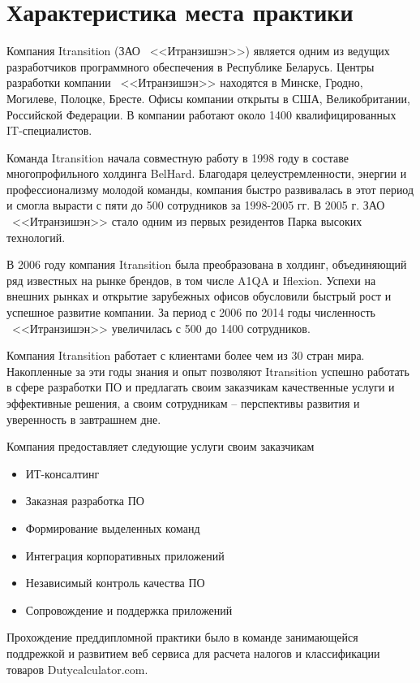\section{Характеристика места практики}
\label{sec:practice:itechart_characteristics}
\newcommand{\company}{\mbox{<<Итранзишэн>>}}

Компания Itransition (ЗАО ~\company{}) является одним из ведущих разработчиков программного обеспечения в Республике Беларусь. Центры разработки компании ~\company{} находятся в Минске, Гродно, Могилеве, Полоцке, Бресте. Офисы компании открыты в США, Великобритании, Российской Федерации. В компании работают около 1400 квалифицированных IT-специалистов.

Команда Itransition начала совместную работу в 1998 году в составе многопрофильного холдинга BelHard. Благодаря целеустремленности, энергии и профессионализму молодой команды, компания быстро развивалась в этот период и смогла вырасти с пяти до 500 сотрудников за 1998-2005 гг. В 2005 г. ЗАО ~\company{} стало одним из первых резидентов Парка высоких технологий.

В 2006 году компания Itransition была преобразована в холдинг, объединяющий ряд известных на рынке брендов, в том числе A1QA и Iflexion. Успехи на внешних рынках и открытие зарубежных офисов обусловили быстрый рост и успешное развитие компании. За период с 2006 по 2014 годы численность ~\company{} увеличилась с 500 до 1400 сотрудников.

Компания Itransition работает с клиентами более чем из 30 стран мира. Накопленные за эти годы знания и опыт позволяют Itransition успешно работать в сфере разработки ПО и предлагать своим заказчикам качественные услуги и эффективные решения, а своим сотрудникам – перспективы развития и уверенность в завтрашнем дне.

Компания предоставляет следующие услуги своим заказчикам~
\begin{itemize}
  \item ИТ-консалтинг
  \item Заказная разработка ПО
  \item Формирование выделенных команд
  \item Интеграция корпоративных приложений
  \item Независимый контроль качества ПО
  \item Сопровождение и поддержка приложений
\end{itemize}

Прохождение преддипломной практики было в команде занимающейся поддрежкой и развитием веб сервиса для расчета налогов и классификации товаров
Dutycalculator.com. 